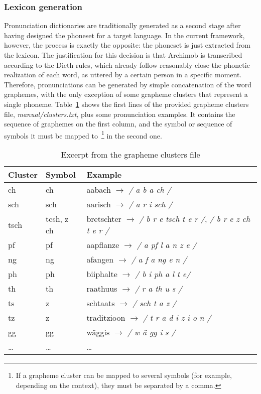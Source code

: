 \documentclass[11pt,a4paper,titlepage,twoside]{article}
\begin{document}
\subsubsection{Lexicon generation}
\label{sec:lexicon-generation}

Pronunciation dictionaries are traditionally generated as a second stage after having designed the phoneset for a target language. In the current framework, however, the process is exactly the opposite: the phoneset is just extracted from the lexicon. The justification for this decision is that Archimob is transcribed according to the Dieth rules, which already follow reasonably close the phonetic realization of each word, as uttered by a certain person in a specific moment. Therefore, pronunciations can be generated by simple concatenation of the word graphemes, with the only exception of some grapheme clusters that represent a single phoneme. Table~\ref{tab:grapheme-clusters} shows the first lines of the provided grapheme clusters file, \textit{manual/clusters.txt}, plus some pronunciation examples. It contains the sequence of graphemes on the first column, and the symbol or sequence of symbols it must be mapped to~\footnote{If a grapheme cluster can be mapped to several symbols (for example, depending on the context), they must be separated by a comma.} in the second one.

\begin{table}[htb!]
  \scriptsize
  \centering
  \begin{tabular}{|l|l|p{4.4cm}|}
    \hline
    \textbf{Cluster} & \textbf{Symbol} & \textbf{Example} \\ \hline \hline
    ch & ch & aabach $\rightarrow$ \textit{/ a b a ch /}  \\ \hline
    sch & sch & aarisch $\rightarrow$ \textit{/ a r i sch /} \\ \hline
    tsch & tcsh, z ch & bretschter $\rightarrow$  \textit{/ b r e tsch t e r /}, \textit{/ b r e z ch t e r /} \\ \hline
    pf & pf & aapflanze $\rightarrow$ \textit{/ a pf l a n z e /} \\ \hline
    ng & ng & afangen $\rightarrow$ \textit{/ a f a ng e n /} \\ \hline
    ph & ph & biiphalte $\rightarrow$ \textit{/ b i ph a l t e/}\\ \hline
    th & th & raathuus $\rightarrow$ \textit{/ r a th u s /} \\ \hline
    ts & z & schtaats $\rightarrow$ \textit{/ sch t a z /}\\ \hline
    tz & z & traditzioon $\rightarrow$ \textit{/ t r a d i z i o n /}\\ \hline
    gg & gg & wäggis $\rightarrow$ \textit{/ w ä gg i s /}\\ \hline
    \ldots & \ldots & \ldots \\
    \hline
  \end{tabular}
  \caption{Excerpt from the grapheme clusters file}
  \label{tab:grapheme-clusters}
\end{table}
\end{document}
